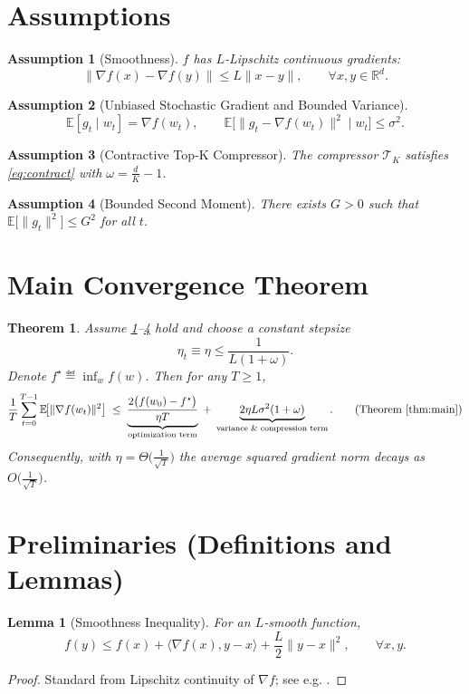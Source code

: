 \documentclass{article}
\newtheorem{theorem}{Theorem}
\newtheorem{lemma}{Lemma}
\newtheorem{assumption}{Assumption}
\newcommand{\TopK}{\mathcal{T}_K}
\newcommand{\E}{\mathbb{E}}
\newcommand{\R}{\mathbb{R}}
\begin{document}
\section*{Assumptions}
\begin{assumption}[Smoothness]\label{ass:smooth}
$f$ has $L$‑Lipschitz continuous gradients:
\[
\|\nabla f(x)-\nabla f(y)\|\le L\|x-y\|,\qquad\forall x,y\in\R^{d}.
\]
\end{assumption}
\begin{assumption}[Unbiased Stochastic Gradient and Bounded Variance]\label{ass:unbiased}
\[
\E[g_t\mid w_t]=\nabla f(w_t),\qquad 
\E\!\big[\|g_t-\nabla f(w_t)\|^{2}\mid w_t\big]\le\sigma^{2}.
\]
\end{assumption}
\begin{assumption}[Contractive Top‑K Compressor]\label{ass:compress}
The compressor $\TopK$ satisfies \eqref{eq:contract} with $\omega=\frac{d}{K}-1$.
\end{assumption}
\begin{assumption}[Bounded Second Moment]\label{ass:bounded}
There exists $G>0$ such that $\E\!\big[\|g_t\|^{2}\big]\le G^{2}$ for all $t$.
\end{assumption}

\section*{Main Convergence Theorem}
\begin{theorem}\label{thm:main}
Assume \ref{ass:smooth}–\ref{ass:bounded} hold and choose a constant stepsize
\[
\eta_t\equiv\eta\le\frac{1}{L(1+\omega)}.
\]
Denote $f^{\star}\eqdef\inf_{w}f(w)$. Then for any $T\ge1$,
\begin{align}
\frac{1}{T}\sum_{t=0}^{T-1}\E\!\big[\|\nabla f(w_t)\|^{2}\big]
\;\le\;
\underbrace{\frac{2\big(f(w_0)-f^{\star}\big)}{\eta T}}_{\text{optimization term}}
\;+\;
\underbrace{2\eta L\sigma^{2}(1+\omega)}_{\text{variance \& compression term}}.
\tag{Theorem~\ref{thm:main}}
\end{align}
Consequently, with $\eta = \Theta\!\big(\tfrac{1}{\sqrt{T}}\big)$ the average squared gradient norm decays as $O\!\big(\tfrac{1}{\sqrt{T}}\big)$.
\end{theorem}

\section*{Preliminaries (Definitions and Lemmas)}
\begin{lemma}[Smoothness Inequality]\label{lem:smooth}
For an $L$‑smooth function,
\[
f(y)\le f(x)+\langle\nabla f(x),y-x\rangle+\frac{L}{2}\|y-x\|^{2},\qquad\forall x,y.
\]
\end{lemma}
\begin{proof}
Standard from Lipschitz continuity of $\nabla f$; see e.g. \cite{Nesterov2004}.
\end{proof}
\end{document}
